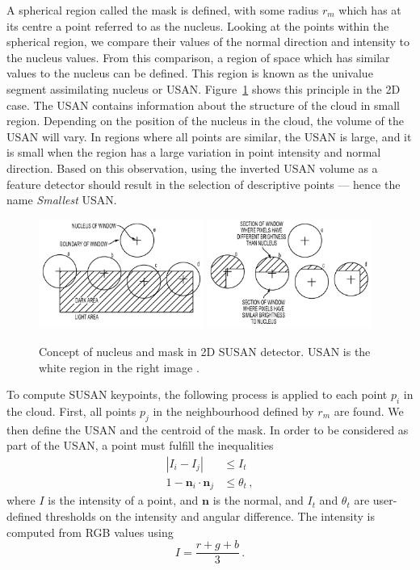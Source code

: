 \documentclass[11pt,a4paper]{kth-mag}
\begin{document}
A spherical region called the mask is defined, with some radius $r_m$ which has
at its centre a point referred to as the nucleus. Looking at the points within
the spherical region, we compare their values of the normal direction and
intensity to the nucleus values. From this comparison, a region of space which
has similar values to the nucleus can be defined. This region is known as the
univalue segment assimilating nucleus or USAN. Figure~\ref{fig:susan_nucleus}
shows this principle in the 2D case. The USAN contains information about the
structure of the cloud in small region. Depending on the position of the nucleus
in the cloud, the volume of the USAN will vary. In regions where all points are
similar, the USAN is large, and it is small when the region has a large
variation in point intensity and normal direction. Based on this observation,
using the inverted USAN volume as a feature detector should result in the
selection of descriptive points --- hence the name \emph{Smallest} USAN.

\begin{figure}
  \centering
  \includegraphics[width=0.48\textwidth]{images/susan1}
  \includegraphics[width=0.48\textwidth]{images/susan}
  \caption{Concept of nucleus and mask in 2D SUSAN detector. USAN is the white
    region in the right image \cite{zhang2013susan}.}
  \label{fig:susan_nucleus}
\end{figure}

To compute SUSAN keypoints, the following process is applied to each point $p_i$
in the cloud. First, all points $p_j$ in the neighbourhood defined by $r_m$ are
found. We then define the USAN and the centroid of the mask. In order to be
considered as part of the USAN, a point must fulfill the inequalities
\begin{align}
  \label{eq:9}
  \left|I_i-I_j\right|&\leq I_t\\
  1-\mathbf{n}_i\cdot\mathbf{n}_j&\leq \theta_t\,,
\end{align}
where $I$ is the intensity of a point, and $\mathbf{n}$ is the normal, and $I_t$
and $\theta_t$ are user-defined thresholds on the intensity and angular
difference. The intensity is computed from RGB values using
\begin{equation}
  \label{eq:10}
  I=\frac{r+g+b}{3}\,.
\end{equation}
\end{document}
